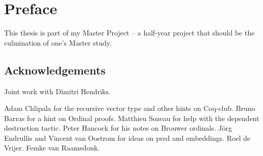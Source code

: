 \chapter*{Preface}
\thispagestyle{empty}

This thesis is part of my Master Project -- a half-year project that should be
the culmination of one's Master study.


\section*{Acknowledgements}

Joint work with Dimitri Hendriks.

Adam Chlipala for the recursive vector type and other hints on
Coq-club. Bruno Barras for a hint on Ordinal proofs. Matthieu Sozeau for help
with the dependent destruction tactic. Peter Hancock for his notes on Brouwer
ordinals. J\"org Endrullis and Vincent van Oostrom for ideas on pred and
embeddings. Roel de Vrijer. Femke van Raamsdonk.
